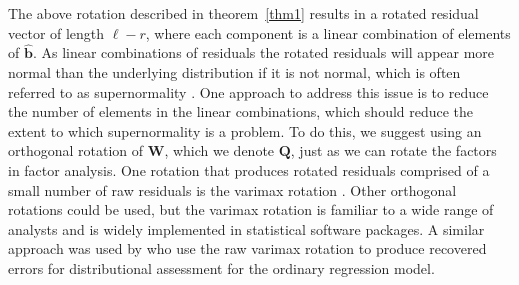 \documentclass{article} %
\newcommand{\al}[1]{{\color{red} #1}}
\begin{document}
\al{
The above rotation described in theorem~\ref{thm1} results in a rotated residual vector of length $\ell - r$, where each component is a linear combination of elements of $\widehat{\bm{b}}$. As linear combinations of residuals the rotated residuals will appear more normal than the underlying distribution if it is not normal, which is often referred to as supernormality \citep{Atkinson:1985}. One approach to address this issue is to reduce the number of elements in the linear combinations, which should reduce the extent to which supernormality is a problem. To do this, we suggest using an orthogonal rotation of $\bm{W}$, which we denote $\bm{Q}$, just as we can rotate the factors in factor analysis. One rotation that produces rotated residuals comprised of a small number of raw residuals is the varimax rotation \citep{Johnson:2007}. Other orthogonal rotations could be used, but the varimax rotation is familiar to a wide range of analysts and is widely implemented in statistical software packages. A similar approach was used by \cite{Jensen:1999iu} who use the raw varimax rotation to produce recovered errors for distributional assessment for the ordinary regression model.
}



\end{document}
